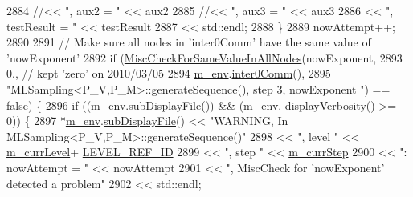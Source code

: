 \begin{DoxyCode}
2884       \textcolor{comment}{//<< ", aux2 = "                  << aux2}
2885       \textcolor{comment}{//<< ", aux3 = "                  << aux3}
2886                                   << \textcolor{stringliteral}{", testResult = "}            << testResult
2887                                   << std::endl;
2888         \}
2889         nowAttempt++;
2890 
2891         \textcolor{comment}{// Make sure all nodes in 'inter0Comm' have the same value of 'nowExponent'}
2892         \textcolor{keywordflow}{if} (\hyperlink{namespace_q_u_e_s_o_a4166a375c5adbea35afaaf20775bc519}{MiscCheckForSameValueInAllNodes}(nowExponent,
2893                                               0., \textcolor{comment}{// kept 'zero' on 2010/03/05}
2894                                               \hyperlink{class_q_u_e_s_o_1_1_m_l_sampling_a13f1ca4fe9f94822fe572a743eaced1d}{m\_env}.\hyperlink{class_q_u_e_s_o_1_1_base_environment_a689e4d140c74d495d97eb498714a4b82}{inter0Comm}(),
2895                                               \textcolor{stringliteral}{"MLSampling<P\_V,P\_M>::generateSequence(), step 3, nowExponent
      "}) == \textcolor{keyword}{false}) \{
2896           \textcolor{keywordflow}{if} ((\hyperlink{class_q_u_e_s_o_1_1_m_l_sampling_a13f1ca4fe9f94822fe572a743eaced1d}{m\_env}.\hyperlink{class_q_u_e_s_o_1_1_base_environment_a8a0064746ae8dddfece4229b9ad374d6}{subDisplayFile}()) && (\hyperlink{class_q_u_e_s_o_1_1_m_l_sampling_a13f1ca4fe9f94822fe572a743eaced1d}{m\_env}.
      \hyperlink{class_q_u_e_s_o_1_1_base_environment_a1fe5f244fc0316a0ab3e37463f108b96}{displayVerbosity}() >= 0)) \{
2897             *\hyperlink{class_q_u_e_s_o_1_1_m_l_sampling_a13f1ca4fe9f94822fe572a743eaced1d}{m\_env}.\hyperlink{class_q_u_e_s_o_1_1_base_environment_a8a0064746ae8dddfece4229b9ad374d6}{subDisplayFile}() << \textcolor{stringliteral}{"WARNING, In
       MLSampling<P\_V,P\_M>::generateSequence()"}
2898                                     << \textcolor{stringliteral}{", level "}        << \hyperlink{class_q_u_e_s_o_1_1_m_l_sampling_af9416874c856e50f3b35270e801f17e4}{m\_currLevel}+
      \hyperlink{_m_l_sampling_level_options_8h_a68d15eaf394d210effcf584b938206d3}{LEVEL\_REF\_ID}
2899                                     << \textcolor{stringliteral}{", step "}         << \hyperlink{class_q_u_e_s_o_1_1_m_l_sampling_a1b1f8ccb4823bdfa26ec652f0807c63e}{m\_currStep}
2900                                     << \textcolor{stringliteral}{": nowAttempt = "} << nowAttempt
2901                                     << \textcolor{stringliteral}{", MiscCheck for 'nowExponent' detected a problem"}
2902                                     << std::endl;

\end{DoxyCode}
